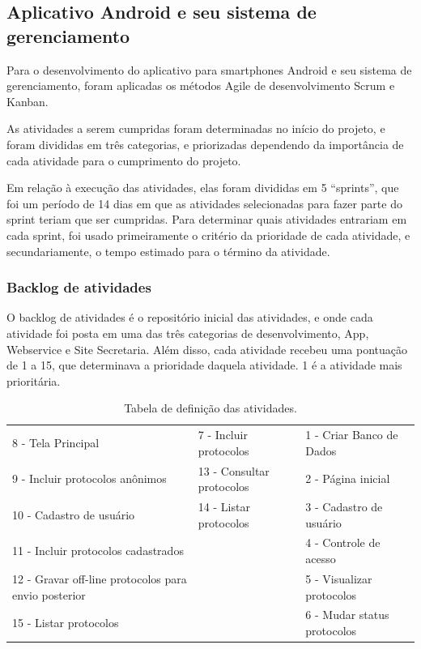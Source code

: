 \documentclass[
	article,			%
	11pt,				%
	oneside,			%
	a4paper,			%
	english,			%
	brazil,				%
	sumario=tradicional
	]{abntex2}
\begin{document}
\subsection{Aplicativo Android e seu sistema de gerenciamento}

Para o desenvolvimento do aplicativo para smartphones Android e seu sistema de gerenciamento, foram aplicadas os métodos Agile de desenvolvimento Scrum e Kanban.

As atividades a serem cumpridas foram determinadas no início do projeto, e foram divididas em três categorias, e priorizadas dependendo da importância de cada atividade para o cumprimento do projeto.

Em relação à execução das atividades, elas foram divididas em 5 “sprints”, que foi um período de 14 dias em que as atividades selecionadas para fazer parte do sprint teriam que ser cumpridas.
Para determinar quais atividades entrariam em cada sprint, foi usado primeiramente o critério da prioridade de cada atividade, e secundariamente, o tempo estimado para o término da atividade.

\subsubsection{Backlog de atividades}

O backlog de atividades é o repositório inicial das atividades, e onde cada atividade foi posta em uma das três categorias de desenvolvimento, App, Webservice e Site Secretaria.
Além disso, cada atividade recebeu uma pontuação de 1 a 15, que determinava a prioridade daquela atividade. 1 é a atividade mais prioritária.

\begin{table}[htbp]
    \caption{Tabela de definição das atividades.}
    \label{tabela-atividades}
    \begin{center}
        \begin{tabular}{|p{5cm}|p{4cm}|p{5cm}|}
            \hline
            8 - Tela Principal & 7 - Incluir protocolos & 1 - Criar Banco de Dados \\
            9 - Incluir protocolos anônimos & 13 - Consultar protocolos & 2 - Página inicial \\
            10 - Cadastro de usuário & 14 - Listar protocolos & 3 - Cadastro de usuário \\
            11 - Incluir protocolos cadastrados & & 4 - Controle de acesso \\
            12 - Gravar off-line protocolos para envio posterior & & 5 - Visualizar protocolos \\
            15 - Listar protocolos & & 6 - Mudar status protocolos \\
            \hline
        \end{tabular}
    \end{center}
\end{table}
\end{document}
